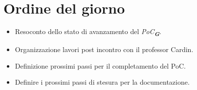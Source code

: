 

\section{Ordine del giorno}

\begin{itemize}
    \item Resoconto dello stato di avanzamento del \emph{PoC}\textsubscript{\textit{\textbf{G}}}.
    \item Organizzazione lavori post incontro con il professor Cardin.
    \item Definizione prossimi passi per il completamento del PoC.
    \item Definire i prossimi passi di stesura per la documentazione.
\end{itemize}

